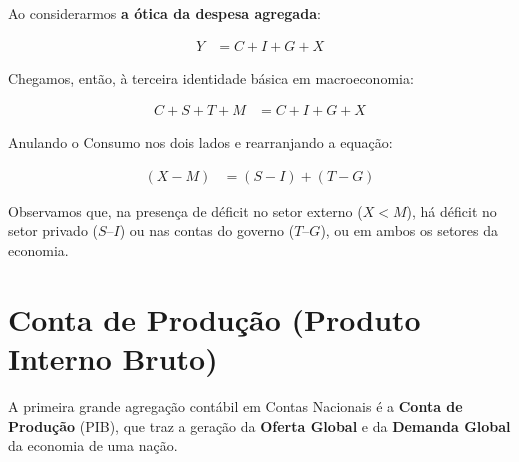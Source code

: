 \documentclass{article}\usepackage[]{graphicx}\usepackage[]{xcolor}
\begin{document}
Ao considerarmos \textbf{a ótica da despesa agregada}:


\begin{equation}\label{eq17}
\begin{split}
    Y &= C + I + G + X
\end{split}
\end{equation}

Chegamos, então, à terceira identidade básica em macroeconomia:

\begin{equation}\label{eq18}
\begin{split}
    C + S + T + M &= C + I + G + X
\end{split}
\end{equation}

Anulando o Consumo nos dois lados e rearranjando a equação:

\begin{equation}\label{eq19}
\begin{split}
    (X - M) &= (S - I) + (T - G)
\end{split}
\end{equation}

Observamos que, na presença de déficit no setor externo (\(X < M\)), há déficit no
setor privado (\(S – I\)) ou nas contas do governo (\(T – G\)), ou em ambos os setores da economia.

\section*{Conta de Produção (Produto Interno Bruto)}

A primeira grande agregação contábil em Contas Nacionais é a \textbf{Conta de Produção} (PIB),
que traz a geração da \textbf{Oferta Global} e da \textbf{Demanda Global} da economia de uma nação.
\end{document}
